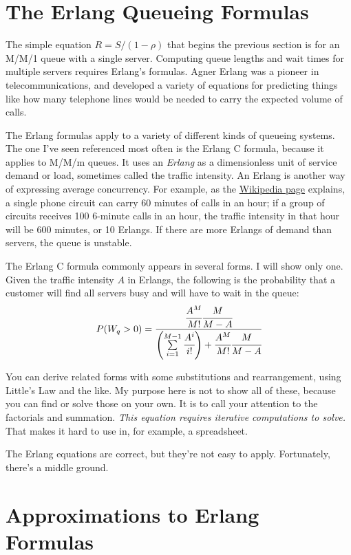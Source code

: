 \documentclass{vivid_layout}
\begin{document}
\section{The Erlang Queueing Formulas}

The simple equation $R=S/(1-\rho)$ that begins the previous section is for an M/M/1 queue with a single server. Computing queue lengths and wait times for multiple servers requires Erlang's formulas. Agner Erlang was a pioneer in telecommunications, and developed a variety of equations for predicting things like how many telephone lines would be needed to carry the expected volume of calls.

The Erlang formulas apply to a variety of different kinds of queueing systems. The one I've seen referenced most often is the Erlang C formula, because it applies to M/M/m queues. It uses an {\itshape Erlang} as a dimensionless unit of service demand or load, sometimes called the traffic intensity. An Erlang is another way of expressing average concurrency. For example, as the \href{http://en.wikipedia.org}{Wikipedia page} explains, a single phone circuit can carry 60 minutes of calls in an hour; if a group of circuits receives 100 6-minute calls in an hour, the traffic intensity in that hour will be 600 minutes, or 10 Erlangs. If there are more Erlangs of demand than servers, the queue is unstable.

The Erlang C formula commonly appears in several forms. I will show only one. Given the traffic intensity $A$ in Erlangs, the following is the probability that a customer will find all servers busy and will have to wait in the queue:
\[
P(W_q > 0) = \cfrac{\cfrac{A^M}{M!}\cfrac{M}{M-A}}{\left( \sum\limits_{i=1}^{M-1} \cfrac{A^i}{i!} \right) + \cfrac{A^M}{M!}\cfrac{M}{M-A}}
\]	%

You can derive related forms with some substitutions and rearrangement, using Little's Law and the like. My purpose here is not to show all of these, because you can find or solve those on your own. It is to call your attention to the factorials and summation. {\itshape This equation requires iterative computations to solve.} That makes it hard to use in, for example, a spreadsheet.

The Erlang equations are correct, but they're not easy to apply.
Fortunately, there's a middle ground.

\section{Approximations to Erlang Formulas}
\end{document}
